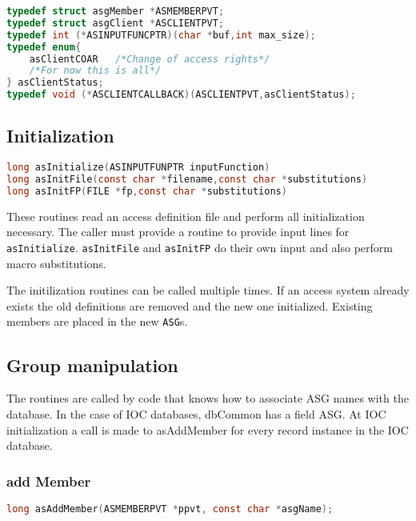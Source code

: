 \begin{lstlisting}[language=C]
typedef struct asgMember *ASMEMBERPVT;
typedef struct asgClient *ASCLIENTPVT;
typedef int (*ASINPUTFUNCPTR)(char *buf,int max_size);
typedef enum{
    asClientCOAR   /*Change of access rights*/
    /*For now this is all*/
} asClientStatus;
typedef void (*ASCLIENTCALLBACK)(ASCLIENTPVT,asClientStatus);

\end{lstlisting}

\subsection{Initialization}

\begin{lstlisting}[language=C]
long asInitialize(ASINPUTFUNPTR inputFunction)
long asInitFile(const char *filename,const char *substitutions)
long asInitFP(FILE *fp,const char *substitutions)
\end{lstlisting}

These routines read an access definition file and perform all initialization necessary. The caller must provide a routine to 
provide input lines for \verb|asInitialize|.
\verb|asInitFile| and \verb|asInitFP| do their own input and also perform macro 
substitutions.

The initilization routines can be called multiple times. If an access system already exists the old definitions are removed 
and the new one initialized. Existing members are placed in the new \verb|ASG|s. 

\subsection{Group manipulation}

The routines are called by code that knows how to associate ASG names with the database. In the case of IOC databases, 
dbCommon has a field ASG. At IOC initialization a call is made to asAddMember for every record instance in the IOC 
database.

\subsubsection{add Member}

\begin{lstlisting}[language=C]
long asAddMember(ASMEMBERPVT *ppvt, const char *asgName);
\end{lstlisting}

